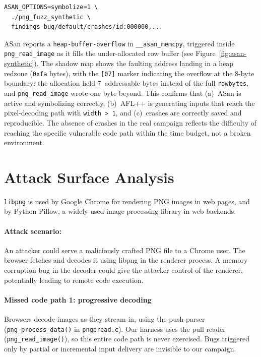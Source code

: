 \begin{verbatim}
ASAN_OPTIONS=symbolize=1 \
  ./png_fuzz_synthetic \
  findings-bug/default/crashes/id:000000,...
\end{verbatim}
\vspace{-7pt}
ASan reports a \verb|heap-buffer-overflow| in \verb|__asan_memcpy|,
triggered inside \verb|png_read_image| as it fills the under-allocated
row buffer (see Figure~\ref{fig:asan-synthetic}). The shadow map shows
the faulting address landing in a heap redzone (\verb|0xfa| bytes), with
the \verb|[07]| marker indicating the overflow at the 8-byte boundary:
the allocation held 7~addressable bytes instead of the full
\verb|rowbytes|, and \verb|png_read_image| wrote one byte beyond. This
confirms that (a)~ASan is active and symbolizing correctly, (b)~AFL++
is generating inputs that reach the pixel-decoding path with
\verb|width > 1|, and (c)~crashes are correctly saved and reproducible.
The absence of crashes in the real campaign reflects the difficulty of
reaching the specific vulnerable code path within the time budget, not
a broken environment.

\vspace{-8pt}
\section{Attack Surface Analysis}
\vspace{-7pt}
  \verb|libpng| is used by Google Chrome for rendering PNG images in web pages, and by Python Pillow, a widely used image processing library in web backends. 
  \vspace{-12pt}
  \paragraph{Attack scenario:} An attacker could serve a
  maliciously crafted PNG file to a Chrome user. The browser fetches and decodes it using libpng in the renderer process. A memory corruption bug in the decoder could give the attacker control of the
  renderer, potentially leading to remote code execution. 
  \vspace{-12pt}
  \paragraph{Missed code path 1: progressive decoding} Browsers decode images as they stream in, using the push parser (\texttt{png\_process\_data()}
  in \texttt{pngpread.c}). Our harness uses the pull reader (\texttt{png\_read\_image()}), so this entire code path is never exercised. Bugs triggered only by partial or incremental input delivery are
  invisible to our campaign. 
  \vspace{-12pt}
